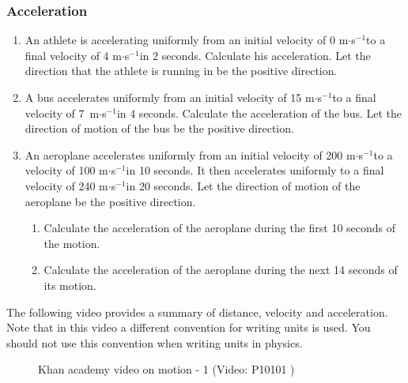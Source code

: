             \subsubsection{  Acceleration }
            \nopagebreak
      \label{m38794*id62523}\begin{enumerate}[noitemsep, label=\textbf{\arabic*}. ] 
            \label{m38794*uid78}\item An athlete is accelerating uniformly from an initial velocity of 0 m$\ensuremath{\cdot}$s${}^{-1}$to a final velocity of 4 m$\ensuremath{\cdot}$s${}^{-1}$in 2 seconds. Calculate his acceleration. Let the direction that the athlete is running in be the positive direction.\newline
\label{m38794*uid79}\item A bus accelerates uniformly from an initial velocity of 15 m$\ensuremath{\cdot}$s${}^{-1}$to a final velocity of 7~m$\ensuremath{\cdot}$s${}^{-1}$in 4 seconds. Calculate the acceleration of the bus. Let the direction of motion of the bus be the positive direction.\newline
\label{m38794*uid80}\item An aeroplane accelerates uniformly from an initial velocity of 200 m$\ensuremath{\cdot}$s${}^{-1}$to a velocity of 100 m$\ensuremath{\cdot}$s${}^{-1}$in 10 seconds. It then accelerates uniformly to a final velocity of 240 m$\ensuremath{\cdot}$s${}^{-1}$in 20 seconds. Let the direction of motion of the aeroplane be the positive direction.
\label{m38794*id68889}\begin{enumerate}[noitemsep, label=\textbf{\alph*}. ] 
            \label{m38794*uid81}\item Calculate the acceleration of the aeroplane during the first 10 seconds of the motion.
\label{m38794*uid82}\item Calculate the acceleration of the aeroplane during the next 14 seconds of its motion.
\end{enumerate}
                \end{enumerate}
\label{m38794*eip-307}The following video provides a summary of distance, velocity and acceleration. Note that in this video a different convention for writing units is used. You should not use this convention when writing units in physics.
    \setcounter{subfigure}{0}
	\begin{figure}[H] %
    \textnormal{Khan academy video on motion - 1}\vspace{.1in} \nopagebreak
  \label{m38794*yt-media1}\label{m38794*yt-video1}
             { (Video:  P10101 )}
      \vspace{2pt}
    \vspace{.1in}
 \end{figure}       \par 
